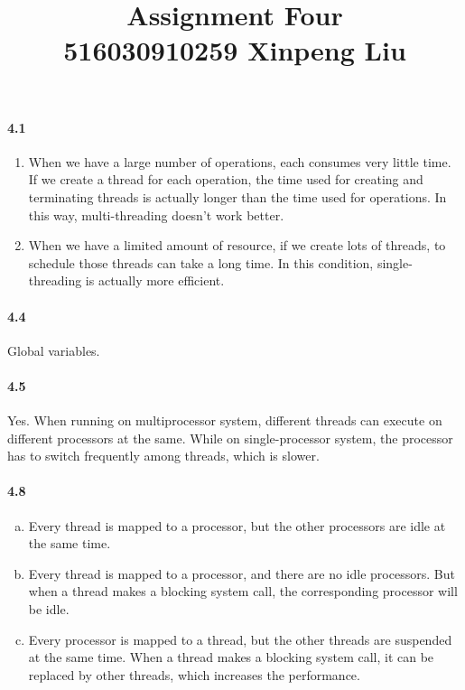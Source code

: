 \documentclass[12pt,a4]{article}
\date{}
\title{
	Assignment Four \\
	\vspace{3mm}
	{\normalsize 516030910259 \textbf{Xinpeng Liu}}
}
\begin{document}
    \maketitle
	\paragraph{4.1} 
		\begin{enumerate}
			\item When we have a large number of operations, each consumes very little time. If we create a thread for each operation, the time used for creating and terminating threads is actually longer than the time used for operations. In this way, multi-threading doesn't work better.
			\item When we have a limited amount of resource, if we create lots of threads, to schedule those threads can take a long time. In this condition, single-threading is actually more efficient. 
		\end{enumerate}
	\paragraph{4.4} Global variables.
	\paragraph{4.5} Yes. When running on multiprocessor system, different threads can execute on different processors at the same. While on single-processor system, the processor has to switch frequently among threads, which is slower.
	\paragraph{4.8} 
		\begin{enumerate}[a.]
			\item Every thread is mapped to a processor, but the other processors are idle at the same time.
			\item Every thread is mapped to a processor, and there are no idle processors. But when a thread makes a blocking system call, the corresponding processor will be idle.
			\item Every processor is mapped to a thread, but the other threads are suspended at the same time. When a thread makes a blocking system call, it can be replaced by other threads, which increases the performance.
		\end{enumerate}
\end{document}
